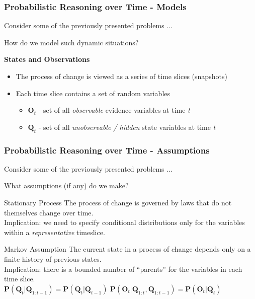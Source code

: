 \begin{frame}[t]
  \frametitle{Probabilistic Reasoning over Time - Models}
	Consider some of the previously presented problems ...
	\vspace*{0.5em}
	\pause	
	
	How do we model such dynamic situations? 
	\vspace*{1em}
	\pause	
	
	\textbf{States and Observations}
	\begin{itemize}
		\item The process of change is viewed as a series of \alert{time slices (snapshots)}
		\item Each time slice contains a set of random variables
    	\begin{itemize}
	    	\item $\mathbf{O}_t$ - set of all \alert{\emph{observable}} evidence variables at time \emph{t}
			\item $\mathbf{Q}_t$ - set of all \alert{\emph{unobservable / hidden}} state variables at time \emph{t}
		\end{itemize}
	\end{itemize}
\end{frame}

\begin{frame}[t]
  \frametitle{Probabilistic Reasoning over Time - Assumptions}
	Consider some of the previously presented problems ...
	\vspace*{0.5em}
	\pause	
	
	What \alert{assumptions} (if any) do we make?
	\pause	
	
	\begin{block}{Stationary Process}
		The process of change is governed by laws \alert{that do not themselves change over time}.\\
		\alert{Implication:} we need to specify conditional distributions only for the variables within a \emph{representative} timeslice.
	\end{block}
	
	\pause	
	
	\begin{block}{Markov Assumption}
		The current state in a process of change depends only on a \alert{finite history} of previous states.
		\\
		\alert{Implication:} there is a \alert{bounded} number of ``parents'' for the variables in each time 
		slice.\\
		$\mathbf{P}(\mathbf{Q}_t \vert \mathbf{Q}_{1:t-1}) = \mathbf{P}(\mathbf{Q}_t \vert \mathbf{Q}_{t-1})$
		\hspace*{1em}
		$\mathbf{P}(\mathbf{O}_t \vert \mathbf{Q}_{1:t}, \mathbf{Q}_{1:t-1}) = \mathbf{P}(\mathbf{O}_t \vert \mathbf{Q}_t)$
	\end{block}
  
\end{frame}


